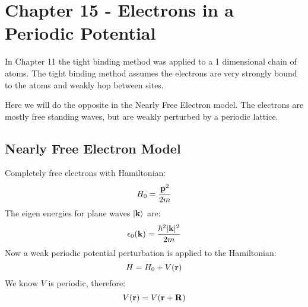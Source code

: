 \section{Chapter 15 - Electrons in a Periodic Potential} 
	In Chapter 11 the tight binding method was applied to a 1 dimensional chain of atoms.  The tight binding method assumes the electrons are very strongly bound to the atoms and weakly hop between sites.  
	
	Here we will do the opposite in the Nearly Free Electron model.  The electrons are mostly free standing waves, but are weakly perturbed by a periodic lattice.
	\subsection{Nearly Free Electron Model}
		Completely free electrons with Hamiltonian:
			\begin{equation}
				H_0 = \frac{\textrm{\textbf{p}}^2}{2m}
			\end{equation}
			The eigen energies for plane waves $|\textrm{\textbf{k}}\rangle$ are:
			\begin{equation}
				\epsilon_0(\textrm{\textbf{k}}) = \frac{\hbar^2|\textrm{\textbf{k}}|^2}{2m}
			\end{equation}
			Now a weak periodic potential perturbation is applied to the Hamiltonian:
			\begin{equation}
				H = H_0+ V(\textrm{\textbf{r}})
			\end{equation}
			We know $V$ is periodic, therefore:
			\begin{equation}
				V(\textrm{\textbf{r}}) = V(\textrm{\textbf{r}}+\textrm{\textbf{R}})
			\end{equation}
			